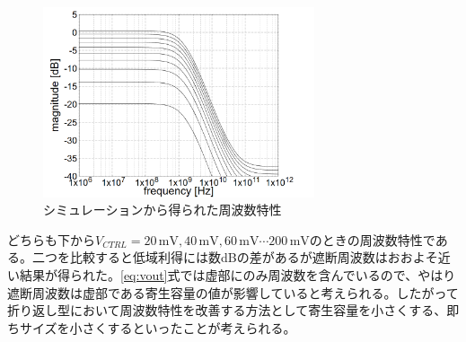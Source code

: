 \documentclass[twocolumn]{jsarticle}
\begin{document}
    \begin{figure}[H]
        \begin{center}
            \includegraphics*[width = 80mm]{figures/vout_ac_simulation_monochrome.PNG}
            \caption{シミュレーションから得られた周波数特性}
            \label{fig:vout_sim}
        \end{center}
    \end{figure}
    どちらも下から$V_{CTRL}=20\,\mathrm{mV},40\,\mathrm{mV},60\,\mathrm{mV}\cdots200\,\mathrm{mV}$のときの周波数特性である。二つを比較すると低域利得には数dBの差があるが遮断周波数はおおよそ近い結果が得られた。\eqref{eq:vout}式では虚部にのみ周波数を含んでいるので、やはり遮断周波数は虚部である寄生容量の値が影響していると考えられる。したがって折り返し型において周波数特性を改善する方法として寄生容量を小さくする、即ちサイズを小さくするといったことが考えられる。
\end{document}
